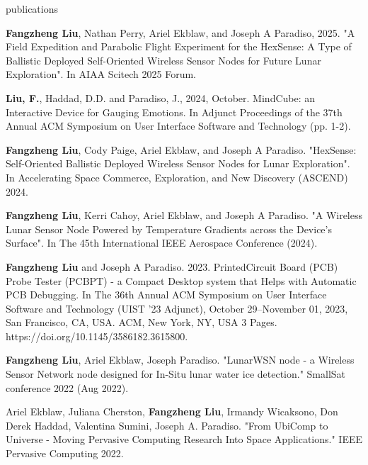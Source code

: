 \documentclass{resume} %
\begin{document}
\begin{rSection}{publications}
\begin{itemlabel}
\item \textbf{Fangzheng Liu}, Nathan Perry, Ariel Ekblaw, and Joseph A Paradiso, 2025.
"A Field Expedition and Parabolic Flight Experiment for the HexSense: A Type of Ballistic
Deployed Self-Oriented Wireless Sensor Nodes for Future Lunar Exploration".
In AIAA Scitech 2025 Forum.
\smallskip
\smallskip
\smallskip

\item \textbf{Liu, F.}, Haddad, D.D. and Paradiso, J., 2024, October.
MindCube: an Interactive Device for Gauging Emotions.
In Adjunct Proceedings of the 37th Annual ACM Symposium on User Interface Software and Technology (pp. 1-2).
\smallskip
\smallskip
\smallskip

\item \textbf{Fangzheng Liu}, Cody Paige, Ariel Ekblaw, and Joseph A Paradiso.
"HexSense: Self-Oriented Ballistic Deployed Wireless Sensor Nodes for Lunar Exploration".
In Accelerating Space Commerce, Exploration, and New Discovery (ASCEND) 2024.
\smallskip
\smallskip
\smallskip

\item \textbf{Fangzheng Liu}, Kerri Cahoy, Ariel Ekblaw, and Joseph A Paradiso.
"A Wireless Lunar Sensor Node Powered by Temperature Gradients across the Device's Surface".
In The 45th International IEEE Aerospace Conference (2024).
\smallskip
\smallskip
\smallskip

\item \textbf{Fangzheng Liu} and Joseph A Paradiso. 2023.
PrintedCircuit Board (PCB) Probe Tester (PCBPT) - a Compact Desktop system that Helps with Automatic PCB Debugging.
In The 36th Annual ACM Symposium on User Interface Software and Technology (UIST '23 Adjunct),
October 29--November 01, 2023, San Francisco, CA, USA. ACM, New York, NY, USA 3 Pages. https://doi.org/10.1145/3586182.3615800.
\smallskip
\smallskip
\smallskip

\item \textbf{Fangzheng Liu}, Ariel Ekblaw, Joseph Paradiso.
"LunarWSN node - a Wireless Sensor Network node designed for In-Situ lunar water ice detection."
SmallSat conference 2022 (Aug 2022).
\smallskip
\smallskip
\smallskip

\item Ariel Ekblaw, Juliana Cherston, \textbf{Fangzheng Liu}, Irmandy Wicaksono, Don Derek Haddad, Valentina Sumini, Joseph A. Paradiso.
"From UbiComp to Universe - Moving Pervasive Computing Research Into Space Applications."
IEEE Pervasive Computing 2022.
\smallskip
\smallskip
\smallskip


\end{itemlabel}
\end{rSection}
\end{document}
